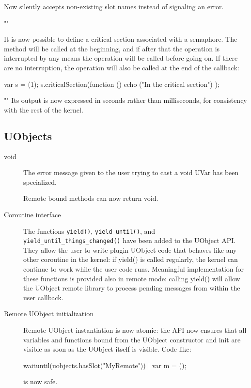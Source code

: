 \begin{description}
  Now silently accepts non-existing slot names instead of signaling an
  error.

\item ""

  It is now possible to define a critical section associated with a
  semaphore. The  method will be called at the
  beginning, and if after that the operation is interrupted by any means the
   operation will be called before going on. If
  there are no interruption, the  operation will
  also be called at the end of the callback:

\begin{urbiunchecked}
var s = (1);
s.criticalSection(function () { echo ("In the critical section") });
\end{urbiunchecked}

\item ""
  Its output is now expressed in seconds rather than milliseconds, for
  consistency with the rest of the kernel.
\end{description}

\subsection{UObjects}

\begin{description}
\item[void] The error message given to the user trying to cast a void UVar
  has been specialized.

  Remote bound methods can now return void.


\item[Coroutine interface]

  The functions \lstinline|yield()|, \lstinline|yield_until()|, and
  \lstinline|yield_until_things_changed()| have been added to the
  UObject API. They allow the user to write plugin UObject code that
  behaves like any other coroutine in the kernel: if yield() is called
  regularly, the kernel can continue to work while the user code runs.
  Meaningful implementation for these functions is provided also in
  remote mode: calling yield() will allow the UObject remote library
  to process pending messages from within the user callback.

\item[Remote UObject initialization]

  Remote UObject instantiation is now atomic: the API now ensures that
  all variables and functions bound from the UObject constructor and
  init are visible as soon as the UObject itself is visible. Code
  like:

\begin{urbiunchecked}
waituntil(uobjects.hasSlot("MyRemote")) | var m = ();
\end{urbiunchecked}

\noindent
is now safe.
\end{description}

